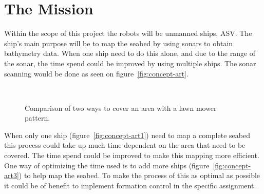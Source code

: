 \section{The Mission}
Within the scope of this project the robots will be unmanned ships,
\ac{ASV}. The ship's main purpose will be to map the seabed by using
sonars to obtain bathymetry data. When one ship need to do this alone, and due to the range of
the sonar, the time spend could be improved by using multiple ships. The sonar scanning would
be done as seen on figure~\vref{fig:concept-art}.

\begin{figure}[htbp]
	\centering
	\ %
	\caption{Comparison of two ways to cover an area with a lawn mower
	pattern.}
	\label{fig:concept-art}
\end{figure}

When only one ship (figure~\vref{fig:concept-art1}) need to map a complete seabed this process could
take up much time dependent on the area that need to be covered. The
time spend could be improved to make this mapping more efficient. One
way of optimizing the time used is to add more ships (figure~\vref{fig:concept-art3}) to help map the
seabed. To make the process of this as optimal as possible it could be
of benefit to implement formation control in the specific assignment.

